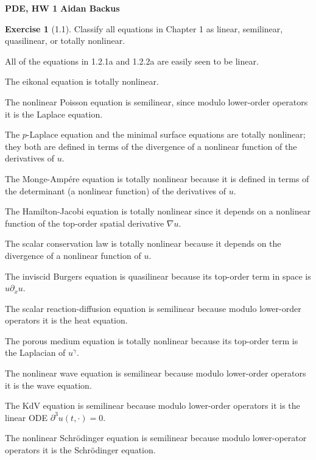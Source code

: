 \documentclass[10pt]{article}
\theoremstyle{definition}
\newtheorem{exer}{Exercise}
\begin{document}
\noindent
\large\textbf{PDE, HW 1} \hfill \textbf{Aidan Backus} \\


\begin{exer}[1.1]
Classify all equations in Chapter 1 as linear, semilinear, quasilinear, or totally nonlinear.
\end{exer}

All of the equations in 1.2.1a and 1.2.2a are easily seen to be linear.

The eikonal equation is totally nonlinear.

The nonlinear Poisson equation is semilinear, since modulo lower-order operators it is the Laplace equation.

The $p$-Laplace equation and the minimal surface equations are totally nonlinear; they both are defined in terms of the divergence of a nonlinear function of the derivatives of $u$.

The Monge-Amp\'ere equation is totally nonlinear because it is defined in terms of the determinant (a nonlinear function) of the derivatives of $u$.

The Hamilton-Jacobi equation is totally nonlinear since it depends on a nonlinear function of the top-order spatial derivative $\nabla u$.

The scalar conservation law is totally nonlinear because it depends on the divergence of a nonlinear function of $u$.

The inviscid Burgers equation is quasilinear because its top-order term in space is $u\partial_x u$.

The scalar reaction-diffusion equation is semilinear because modulo lower-order operators it is the heat equation.

The porous medium equation is totally nonlinear because its top-order term is the Laplacian of $u^\gamma$.

The nonlinear wave equation is semilinear because modulo lower-order operators it is the wave equation.

The KdV equation is semilinear because modulo lower-order operators it is the linear ODE $\partial^3 u(t, \cdot) = 0$.

The nonlinear Schr\"odinger equation is semilinear because modulo lower-operator operators it is the Schr\"odinger equation.
\end{document}
